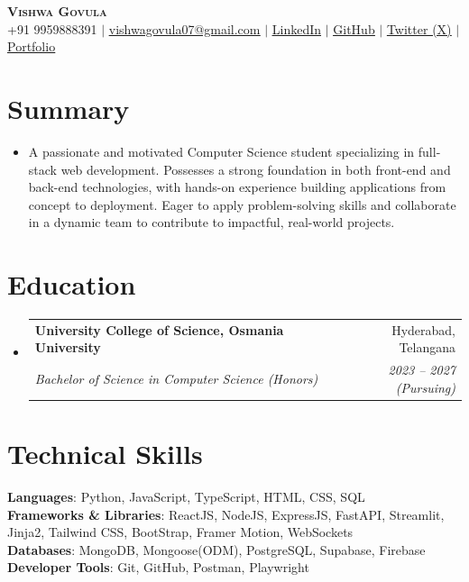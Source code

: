 \documentclass[letterpaper,11pt]{article}
\makeatletter
\newcommand{\resumeItem}[1]{
  \item\small{
    {#1 \vspace{-2pt}}
  }
}
\newcommand{\resumeSubheading}[4]{
  \vspace{-2pt}\item
    \begin{tabular*}{0.97\textwidth}[t]{l@{\extracolsep{\fill}}r}
      \textbf{#1} & #2 \\
      \textit{\small#3} & \textit{\small #4} \\
    \end{tabular*}\vspace{-7pt}
}
\newcommand{\resumeSubHeadingListStart}{\begin{itemize}[leftmargin=0.15in, label={}]}
\newcommand{\resumeSubHeadingListEnd}{\end{itemize}}
\makeatother
\begin{document}
\begin{center}
    \textbf{\Huge \scshape Vishwa Govula} \\ \vspace{1pt}
    \small +91 9959888391 $|$ \href{mailto:vishwagovula07@gmail.com}{\underline{vishwagovula07@gmail.com}} $|$
    \href{https://www.linkedin.com/in/vishwa-govula-1b482a347/}{\underline{LinkedIn}} $|$
    \href{https://github.com/Wreck7}{\underline{GitHub}} $|$
    \href{https://x.com/F1Vishwa}{\underline{Twitter (X)}}
     $|$
    \href{https://vishwa7.netlify.app/}{\underline{Portfolio}}
\end{center}


\section{Summary}
 \resumeSubHeadingListStart
    \resumeItem{A passionate and motivated Computer Science student specializing in full-stack web development. Possesses a strong foundation in both front-end and back-end technologies, with hands-on experience building applications from concept to deployment. Eager to apply problem-solving skills and collaborate in a dynamic team to contribute to impactful, real-world projects.}
  \resumeSubHeadingListEnd


\section{Education}
  \resumeSubHeadingListStart
    \resumeSubheading
      {University College of Science, Osmania University}{Hyderabad, Telangana}
      {Bachelor of Science in Computer Science (Honors)}{2023 -- 2027 (Pursuing)}
  \resumeSubHeadingListEnd


\section{Technical Skills}
 \begin{itemize}[leftmargin=0.15in, label={}]
    \small{\item{
     \textbf{Languages}{: Python, JavaScript, TypeScript, HTML, CSS, SQL} \\
     \textbf{Frameworks \& Libraries}{: ReactJS, NodeJS, ExpressJS, FastAPI, Streamlit, Jinja2, Tailwind CSS, BootStrap, Framer Motion, WebSockets} \\
     \textbf{Databases}{: MongoDB, Mongoose(ODM), PostgreSQL, Supabase, Firebase} \\
     \textbf{Developer Tools}{: Git, GitHub, Postman, Playwright}
    }}
 \end{itemize}
 
\end{document}

